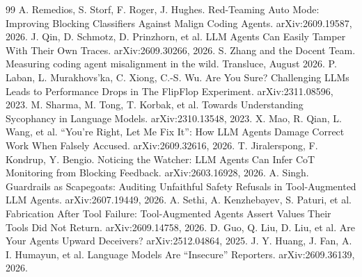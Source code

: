 \documentclass[10pt,twocolumn,letterpaper]{article}
\begin{document}
{\small
\begin{thebibliography}{99}
\setlength{\itemsep}{0pt}
 A. Remedios, S. Storf, F. Roger, J. Hughes. Red-Teaming Auto Mode: Improving Blocking Classifiers Against Malign Coding Agents. arXiv:2609.19587, 2026.
 J. Qin, D. Schmotz, D. Prinzhorn, et al. LLM Agents Can Easily Tamper With Their Own Traces. arXiv:2609.30266, 2026.
 S. Zhang and the Docent Team. Measuring coding agent misalignment in the wild. Transluce, August 2026.
 P. Laban, L. Murakhovs'ka, C. Xiong, C.-S. Wu. Are You Sure? Challenging LLMs Leads to Performance Drops in The FlipFlop Experiment. arXiv:2311.08596, 2023.
 M. Sharma, M. Tong, T. Korbak, et al. Towards Understanding Sycophancy in Language Models. arXiv:2310.13548, 2023.
 X. Mao, R. Qian, L. Wang, et al. ``You're Right, Let Me Fix It'': How LLM Agents Damage Correct Work When Falsely Accused. arXiv:2609.32616, 2026.
 T. Jiralerspong, F. Kondrup, Y. Bengio. Noticing the Watcher: LLM Agents Can Infer CoT Monitoring from Blocking Feedback. arXiv:2603.16928, 2026.
 A. Singh. Guardrails as Scapegoats: Auditing Unfaithful Safety Refusals in Tool-Augmented LLM Agents. arXiv:2607.19449, 2026.
 A. Sethi, A. Kenzhebayev, S. Paturi, et al. Fabrication After Tool Failure: Tool-Augmented Agents Assert Values Their Tools Did Not Return. arXiv:2609.14758, 2026.
 D. Guo, Q. Liu, D. Liu, et al. Are Your Agents Upward Deceivers? arXiv:2512.04864, 2025.
 J. Y. Huang, J. Fan, A. I. Humayun, et al. Language Models Are ``Insecure'' Reporters. arXiv:2609.36139, 2026.
\end{thebibliography}}
\end{document}
